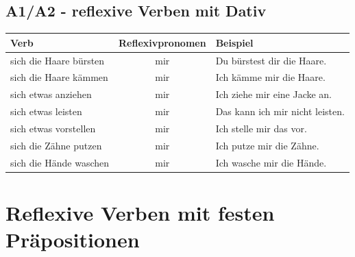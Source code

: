 \subsection*{A1/A2 - reflexive Verben mit Dativ}
\begin{center}
\begin{tabular}{|l|c|l|}
\hline
Verb & Reflexivpronomen & Beispiel \\ \hline
sich die Haare bürsten & mir & Du bürstest dir die Haare. \\ \hline
sich die Haare kämmen & mir & Ich kämme mir die Haare. \\ \hline
sich etwas anziehen & mir & Ich ziehe mir eine Jacke an. \\ \hline
sich etwas leisten & mir & Das kann ich mir nicht leisten. \\ \hline
sich etwas vorstellen & mir & Ich stelle mir das vor. \\ \hline
sich die Zähne putzen & mir & Ich putze mir die Zähne. \\ \hline
sich die Hände waschen & mir & Ich wasche mir die Hände. \\ \hline
\end{tabular}
\end{center}

\section{Reflexive Verben mit festen Präpositionen}
\label{sec:ReflexivMitPraep}

